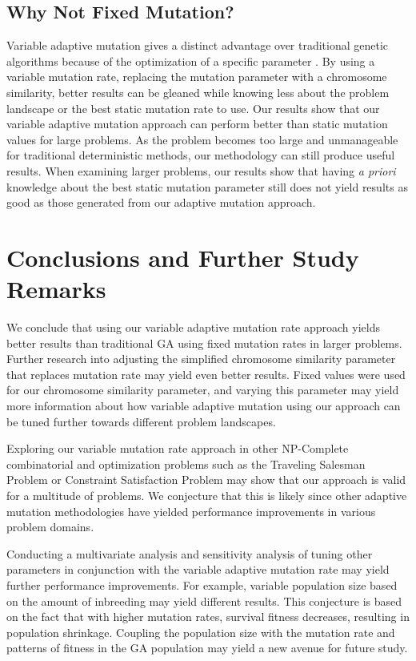 \documentclass[conference]{IEEEtran}
\begin{document}
\subsection{Why Not Fixed Mutation?}
Variable adaptive mutation gives a distinct advantage over traditional genetic algorithms because of the optimization of a specific parameter \cite{hesser1991towards,ye2010some}. By using a variable mutation rate, replacing the mutation parameter with a chromosome similarity, better results can be gleaned while knowing less about the problem landscape or the best static mutation rate to use. Our results show that our variable adaptive mutation approach can perform better than static mutation values for large problems. As the problem becomes too large and unmanageable for traditional deterministic methods, our methodology can still produce useful results. When examining larger problems, our results show that having \emph{a priori} knowledge about the best static mutation parameter still does not yield results as good as those generated from our adaptive mutation approach.

\section{Conclusions and Further Study Remarks}
We conclude that using our variable adaptive mutation rate approach yields better results than traditional GA using fixed mutation rates in larger problems. Further research into adjusting the simplified chromosome similarity parameter that replaces mutation rate may yield even better results. Fixed values were used for our chromosome similarity parameter, and varying this parameter may yield more information about how variable adaptive mutation using our approach can be tuned further towards different problem landscapes.

Exploring our variable mutation rate approach in other NP-Complete combinatorial and optimization problems such as the Traveling Salesman Problem or Constraint Satisfaction Problem may show that our approach is valid for a multitude of problems. We conjecture that this is likely since other adaptive mutation methodologies have yielded performance improvements in various problem domains.

Conducting a multivariate analysis and sensitivity analysis of tuning other parameters in conjunction with the variable adaptive mutation rate may yield further performance improvements. For example, variable population size based on the amount of inbreeding may yield different results. This conjecture is based on the fact that with higher mutation rates, survival fitness decreases, resulting in population shrinkage. Coupling the population size with the mutation rate and patterns of fitness in the GA population may yield a new avenue for future study.
\end{document}
